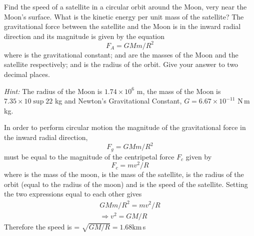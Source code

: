 \begin{problem}
{Find the speed of a satellite in a circular orbit around the Moon, very near the Moon's surface. What is the kinetic energy per unit mass of the satellite?
The gravitational force  between the satellite and the Moon is in the inward radial direction and its magnitude is given by the equation 
\begin{equation*}
F_A=GMm/R^2
\end{equation*}
where  is the gravitational constant;  and  are the masses of the Moon and the satellite respectively; and  is the radius of the orbit. Give your answer to two decimal places.

\emph{Hint:} The radius of the Moon is $1.74\times 10^6$ {m}, the mass of the Moon is $7.35\times 10\sup{22}$ kg and Newton's Gravitational Constant, $G = 6.67 \times 10^{-11}$ {N\,m\,kg}.} 
{}
{In order to perform circular motion the magnitude of the gravitational force  in the inward radial direction, 
\begin{equation*} F_g=GMm/R^2 \end{equation*}
must be equal to the magnitude of the centripetal force $F_c$ given by 
\begin{equation*} F_c=mv^2/R \end{equation*}
where  is the mass of the moon,  is the mass of the satellite,  is the radius of the orbit (equal to the radius of the moon) and  is the speed of the satellite. Setting the two expressions equal to each other gives
\begin{align*} GMm/R^2=mv^2/R \\ \Rightarrow v^2=GM/R \end{align*}
Therefore the speed is  = $\sqrt{GM/R} = {1.68}${km\,s}
}
\end{problem}